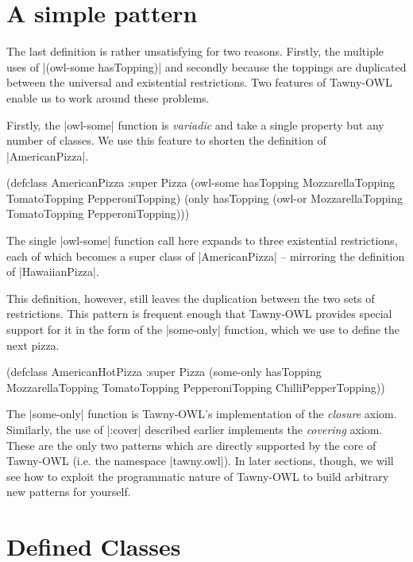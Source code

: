 \section{A simple pattern}
\label{sec:simple-pattern}

The last definition is rather unsatisfying for two reasons. Firstly, the
multiple uses of |(owl-some hasTopping)| and secondly because the toppings are
duplicated between the universal and existential restrictions. Two features of
Tawny-OWL enable us to work around these problems. 

Firstly, the |owl-some| function is \emph{variadic} and take a single property but any
number of classes. We use this feature to shorten the definition of
|AmericanPizza|. 

\begin{tawny}
(defclass AmericanPizza
  :super
  Pizza
  (owl-some hasTopping MozzarellaTopping
            TomatoTopping PepperoniTopping)
  (only hasTopping (owl-or MozzarellaTopping TomatoTopping PepperoniTopping)))
\end{tawny}

The single |owl-some| function call here expands to three existential
restrictions, each of which becomes a super class of |AmericanPizza| --
mirroring the definition of |HawaiianPizza|.

This definition, however, still leaves the duplication between the two sets of
restrictions. This pattern is frequent enough that Tawny-OWL provides special
support for it in the form of the |some-only| function, which we use to define
the next pizza.

\begin{tawny}
(defclass AmericanHotPizza
  :super
  Pizza
  (some-only hasTopping MozzarellaTopping TomatoTopping
             PepperoniTopping ChilliPepperTopping))
\end{tawny}

The |some-only| function is Tawny-OWL's implementation of the \emph{closure} axiom.
Similarly, the use of |:cover| described earlier implements the \emph{covering}
axiom. These are the only two patterns which are directly supported by the
core of Tawny-OWL (i.e. the namespace |tawny.owl|). In later sections, though,
we will see how to exploit the programmatic nature of Tawny-OWL to build
arbitrary new patterns for yourself.

\section{Defined Classes}
\label{defined}

